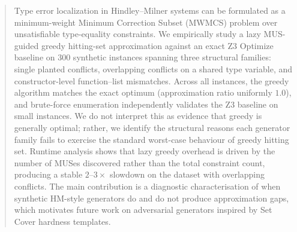 \begin{abstract}
Type error localization in Hindley--Milner systems can be formulated as a
minimum-weight Minimum Correction Subset (MWMCS) problem over unsatisfiable
type-equality constraints. We empirically study a lazy MUS-guided greedy
hitting-set approximation against an exact Z3 Optimize baseline on 300
synthetic instances spanning three structural families: single planted
conflicts, overlapping conflicts on a shared type variable, and constructor-level
function--list mismatches. Across all instances, the greedy algorithm matches
the exact optimum (approximation ratio uniformly $1.0$), and brute-force
enumeration independently validates the Z3 baseline on small instances. We
do not interpret this as evidence that greedy is generally optimal; rather,
we identify the structural reasons each generator family fails to exercise
the standard worst-case behaviour of greedy hitting set. Runtime analysis
shows that lazy greedy overhead is driven by the number of MUSes discovered
rather than the total constraint count, producing a stable $2$--$3\times$
slowdown on the dataset with overlapping conflicts. The main contribution
is a diagnostic characterisation of when synthetic HM-style generators do
and do not produce approximation gaps, which motivates future work on
adversarial generators inspired by Set Cover hardness templates.
\end{abstract}